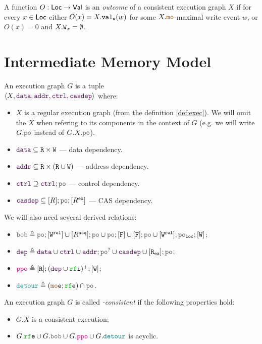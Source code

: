\documentclass[12pt]{article}
\begin{document}
\begin{definition}
  A function $O : \mathsf{Loc} \rightarrow \mathsf{Val}$ is an \emph{outcome} 
  of a consistent execution graph $X$
  if for every $x \in \mathsf{Loc}$ either $O(x) = X.{\mathtt{val_w}}(w)$ 
  for some $X.\lMO$-maximal write event $w$, 
  or $O(x) = 0$ and $X.{\mathtt{W}}_x = \emptyset$.
\end{definition}

\section{Intermediate Memory Model}

\begin{definition}
  An \imm execution graph $G$ is a tuple \\
  $\tup{X, \lDATA, \lADDR, \lCTRL, \lCASDEP}$ where:
  \begin{itemize}
    \item $X$ is a regular execution graph (from the definition \ref{def:exec}).
      We will omit the $X$ when refering to its components in the context of $G$
      (e.g. we will write $G.\lPO$ instead of $G.X.\lPO$).
    \item $\lDATA \subseteq \lR \times \lW$ --- data dependency.
    \item $\lADDR \subseteq \lR \times (\lR \cup \lW)$ --- address dependency.
    \item $\lCTRL \supseteq \lCTRL; \lPO$ --- control dependency.
    \item $\lCASDEP \subseteq [R];\lPO;[R^{\Ex}]$ --- CAS dependency.
  \end{itemize}

  We will also need several derived relations:
  \begin{itemize}
    \item $\lBOB \defeq
      \lPO;[\lW^{\rel}] \cup [R^{\acq}];\lPO \cup \lPO;[\lF] \cup [\lF];\lPO \cup [\lW^{\rel}];\lPO_{\lLOC};[\lW]$;
    \item $\lDEPS \defeq \lDATA \cup \lCTRL \cup \lADDR;\lPO^? \cup \lCASDEP \cup [\lR_{\Ex}];\lPO$;
    \item $\lPPO \defeq [\lR];(\lDEPS \cup \lRFI)^+;[\lW]$;
    \item $\lDETOUR \defeq (\lMOE;\lRFE) \cap \lPO$.
  \end{itemize}

\end{definition}

\begin{definition}
  An \imm execution graph $G$ is called \emph{\imm-consistent} if the following properties hold:
  \begin{itemize}
    \item $G.X$ is a consistent execution;
    \item $G.\lRFE \cup G.\lBOB \cup G.\lPPO \cup G.\lDETOUR$ is acyclic.
  \end{itemize}
\end{definition}
\end{document}
